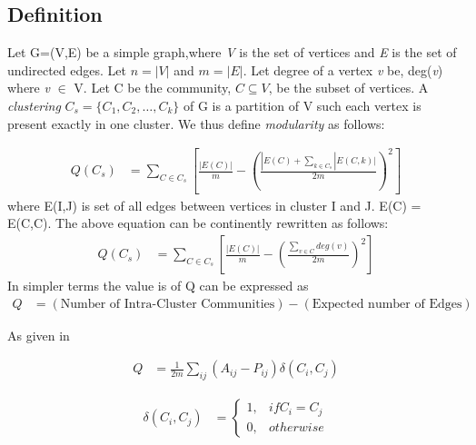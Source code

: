 \subsection{Definition}
Let G=(V,E) be a simple graph,where \textit{V} is the set of vertices and \textit{E} is the set of undirected edges. Let $n=|V|$ and $m=|E|$. Let degree of a vertex \textit{v} be, deg(\textit{v}) where \textit{v} $\in$ V. Let C be the community, $C \subseteq V$, be the subset of vertices. A \textit{clustering} $C_s =\{C_1,C_2, \ldots, C_k\}$ of G is a partition of V such each vertex is present exactly in one cluster.  We thus define \textit{modularity } as follows: \cite{modularityNP}

\begin{equation} \label{eq1}
\begin{split}
Q(C_s) &= \sum_{C \in C_s}\left[ \frac{|E(C)|}{m} - \left( \frac{|E(C)+\sum_{k \in C_s}|E(C,k)|}{2m} \right)^2 \right]
\end{split}
\end{equation}
where E(I,J) is set of all edges between vertices in cluster I and J. E(C) = E(C,C).
The above equation can be continently rewritten as follows: 
\begin{equation} \label{eq1}
\begin{split}
Q(C_s) &= \sum_{C \in C_s}\left[ \frac{|E(C)|}{m} - \left( \frac{\sum_{v \in C}deg(v)}{2m} \right)^2 \right]
\end{split}
\end{equation}
In simpler terms the value is of Q can be expressed as 
\begin{equation} \label{eq1}
\begin{split}
Q &= \left( \text{Number of Intra-Cluster Communities} \right) - (\text{Expected number of Edges})
\end{split}
\end{equation}

As given in \cite{Louvain}

\begin{equation}
    \begin{split}
Q &= \frac{1}{2m} \sum_{ij} \left(A_{ij} - P_{ij}\right) \delta(C_i,C_j)
\end{split}
    \end{equation}

\begin{equation}
\begin{split}
\delta(C_i,C_j) &= \begin{cases} 1 ,& if C_i = C_j \\
 0,& otherwise
 \end{cases}
\end{split}
\end{equation}


